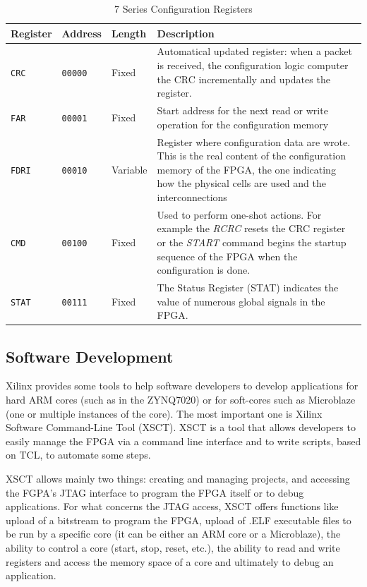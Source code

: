 \begin{table}[H]
\centering
    \begin{tabular}{p{2cm}|p{2cm}|p{1.5cm}|p{7cm}}
        \textbf{Register} & \textbf{Address} & \textbf{Length} & \textbf{Description} \\
        \hline
        \texttt{CRC} & \texttt{00000} & Fixed & Automatical updated register: when a packet is received, the configuration logic computer the CRC incrementally and updates the register. \\
        \hline
        \texttt{FAR} & \texttt{00001} & Fixed & Start address for the next read or write operation for the configuration memory\\
        \hline
        \texttt{FDRI} & \texttt{00010} & Variable & Register where configuration data are wrote. This is the real content of the configuration memory of the FPGA, the one indicating how the physical cells are used and the interconnections\\
        \hline
        \texttt{CMD} & \texttt{00100} & Fixed & Used to perform one-shot actions. For example the \textit{RCRC} resets the CRC register or the \textit{START} command begins the startup sequence of the FPGA when the configuration is done.\\
        \texttt{STAT} & \texttt{00111} & Fixed & The Status Register (STAT) indicates the value of numerous global signals in the FPGA.\\
    \end{tabular}
\caption{7 Series Configuration Registers}
\label{tab:conf_regs}
\end{table}


\subsection{Software Development}

Xilinx provides some tools to help software developers to develop applications for hard ARM cores (such as in the ZYNQ7020) or for soft-cores such as Microblaze (one or multiple instances of the core). The most important one is Xilinx Software Command-Line Tool (XSCT). XSCT is a tool that allows developers to easily manage the FPGA via a command line interface and to write scripts, based on TCL, to automate some steps. \bigskip

XSCT allows mainly two things: creating and managing projects, and accessing the FGPA's JTAG interface to program the FPGA itself or to debug applications. For what concerns the JTAG access, XSCT offers functions like upload of a bitstream to program the FPGA, upload of .ELF executable files to be run by a specific core (it can be either an ARM core or a Microblaze), the ability to control a core (start, stop, reset, etc.), the ability to read and write registers and access the memory space of a core and ultimately to debug an application. \bigskip

